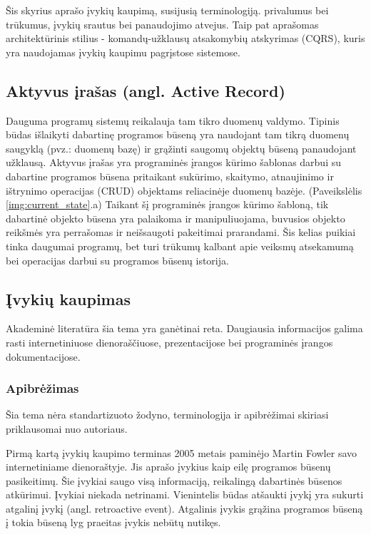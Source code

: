 Šis skyrius aprašo įvykių kaupimą, susijusią terminologiją. privalumus bei trūkumus, įvykių srautus bei panaudojimo atvejus. Taip pat aprašomas architektūrinis stilius - komandų-užklausų atsakomybių atskyrimas (CQRS), kuris yra naudojamas įvykių kaupimu pagrįstose sistemose. 

\subsection{Aktyvus įrašas (angl. Active Record)}

Dauguma programų sistemų reikalauja tam tikro duomenų valdymo. Tipinis būdas išlaikyti dabartinę programos būseną yra naudojant tam tikrą duomenų saugyklą (pvz.: duomenų bazę) ir grąžinti saugomų objektų būseną panaudojant užklausą. Aktyvus įrašas yra programinės įrangos kūrimo šablonas darbui su dabartine programos būsena pritaikant sukūrimo, skaitymo, atnaujinimo ir ištrynimo operacijas (CRUD) objektams reliacinėje duomenų bazėje. \cite{Fowler:2002:PEA:579257} (Paveikslėlis \ref{img:current_state}.a) Taikant šį programinės įrangos kūrimo šabloną, tik dabartinė objekto būsena yra palaikoma ir manipuliuojama, buvusios objekto reikšmės yra perrašomas ir neišsaugoti pakeitimai prarandami. Šis kelias puikiai tinka daugumai programų, bet turi trūkumų kalbant apie veiksmų atsekamumą bei operacijas darbui su programos būsenų istorija.

\subsection{Įvykių kaupimas}

Akademinė literatūra šia tema yra ganėtinai reta. Daugiausia informacijos galima rasti internetiniuose dienoraščiuose, prezentacijose bei programinės įrangos dokumentacijose.

\subsubsection{Apibrėžimas}

Šia tema nėra standartizuoto žodyno, terminologija ir apibrėžimai skiriasi priklausomai nuo autoriaus.

Pirmą kartą įvykių kaupimo terminas 2005 metais paminėjo Martin Fowler savo internetiniame dienoraštyje. \cite{Fowler:EventSourcing} Jis aprašo įvykius kaip eilę programos būsenų pasikeitimų. Šie įvykiai saugo visą informaciją, reikalingą dabartinės būsenos atkūrimui. Įvykiai niekada netrinami. Vienintelis būdas atšaukti įvykį yra sukurti atgalinį įvykį (angl. retroactive event). \cite{Fowler:RetroactiveEvent} Atgalinis įvykis grąžina programos būseną į tokia būseną lyg praeitas įvykis nebūtų nutikęs.

